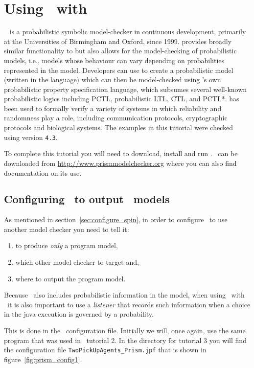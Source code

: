 \documentclass[a4]{article}
\begin{document}
\section{Using \ajpf\ with \prism}
\prism{}~\cite{KNP11} is a probabilistic symbolic model-checker in
continuous development, primarily at the Universities of Birmingham
and Oxford, since 1999. \prism{} provides broadly similar
functionality to \spin{} but also allows for the model-checking of
probabilistic models, i.e., models whose behaviour can vary depending
on probabilities represented in the model. Developers can use \prism{} to
create a probabilistic model (written in the \prism{} language) which
can then be model-checked using \prism{}'s own probabilistic property
specification language, which subsumes several well-known
probabilistic logics including PCTL, probabilistic LTL, CTL, and
PCTL*.  \prism{} has been used to formally verify a variety of systems
in which reliability and randomness play a role, including
communication protocols, cryptographic protocols and biological
systems. The examples in this tutorial were checked using \prism{} version
\texttt{4.3}.

To complete this tutorial you will need to download, install and run \prism.  \prism\ can be downloaded from \url{http://www.prismmodelchecker.org} where you can also find documentation on its use.

\subsection{Configuring \ajpf\ to output \prism\ models}

As mentioned in section~\ref{sec:configure_spin}, in order to configure \ajpf\ to use another model checker you need to tell it:
\begin{enumerate}
\item to produce \emph{only} a program model, 
\item which other model checker to target and,
\item where to output the program model.  
\end{enumerate}
Because \prism\ also includes probabilistic information in the model, when using \ajpf\ with \prism\ it is also important to use a \emph{listener} that records such information when a choice in the java execution is governed by a probability.

This is done in the \ajpf\ configuration file.  Initially we will, once again, use the same program that was used in \ajpf\ tutorial 2.  In the directory for tutorial 3 you will find the configuration file \texttt{TwoPickUpAgents\_Prism.jpf} that is shown in figure~\ref{fig:prism_config1}.
\end{document}
